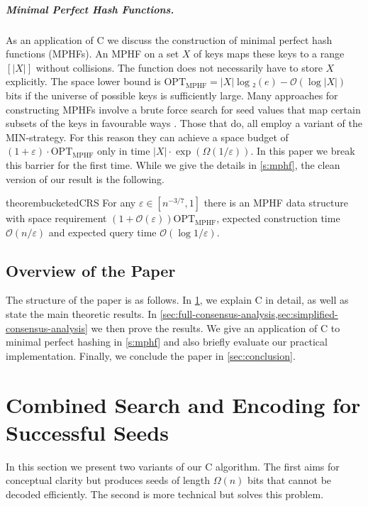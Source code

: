 \documentclass[cleveref,thm-restate]{lipics-v2021}
\def\OPT{\mathrm{OPT}}
\def\OPTMPHF{\OPT_{\mathrm{MPHF}}}
\def\consensus{\texorpdfstring{C\scalebox{0.8}{ONSENSUS}}{CONSENSUS}\xspace}
\begin{document}
\subparagraph{Minimal Perfect Hash Functions.}
\label{sec:mphf-results}
As an application of \consensus we discuss the construction of minimal perfect hash functions (MPHFs).
An MPHF on a set $X$ of keys maps these keys to a range $[|X|]$ without collisions. The function does not necessarily have to store $X$ explicitly. The space lower bound is $\OPTMPHF = |X|\log₂(e)-𝒪(\log |X|)$ bits if the universe of possible keys is sufficiently large. Many approaches for constructing MPHFs involve a brute force search for seed values that map certain subsets of the keys in favourable ways \cite{pibiri2021pthash,esposito2020recsplit,hermann2024phobic,lehmann2023shockhash,lehmann2024shockhash2}. %
Those that do, all employ a variant of the MIN-strategy. For this reason they can achieve a space budget of $(1+ε)·\OPTMPHF$ only in time $|X|·\exp(Ω(1/ε))$. In this paper we break this barrier for the first time.
While we give the details in \cref{s:mphf}, the clean version of our result is the following.
\begin{restatable}[Bucketed \consensus-RecSplit]{theorem}{bucketedCRS}
    \label{thm:improved-recsplit-bucketed}
    For any $ε ∈ [n^{-3/7},1]$ there is an MPHF data structure with space requirement $(1+𝒪(ε))\OPTMPHF$, expected construction time $𝒪(n/ε)$ and expected query time $𝒪(\log 1/ε)$.
\end{restatable}

\subsection{Overview of the Paper}
The structure of the paper is as follows.
In \cref{sec:algorithm}, we explain \consensus in detail, as well as state the main theoretic results.
In \cref{sec:full-consensus-analysis,sec:simplified-consensus-analysis} we then prove the results.
We give an application of \consensus to minimal perfect hashing in \cref{s:mphf} and also briefly evaluate our practical implementation.
Finally, we conclude the paper in \cref{sec:conclusion}.

\section{Combined Search and Encoding for Successful Seeds}
\label{sec:algorithm}

In this section we present two variants of our \consensus algorithm. The first aims for conceptual clarity but produces seeds of length $Ω(n)$ bits that cannot be decoded efficiently. The second is more technical but solves this problem.
\end{document}
